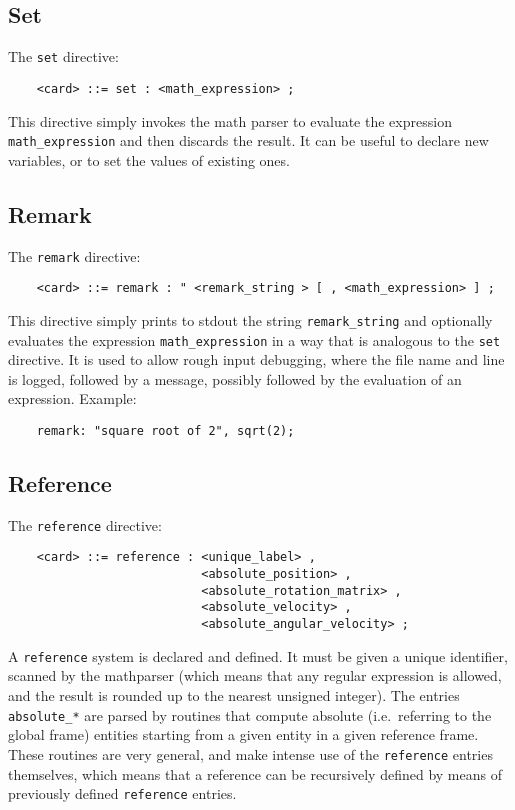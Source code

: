\subsection{Set}
The \texttt{set} directive:
\begin{verbatim}
    <card> ::= set : <math_expression> ;
\end{verbatim}
This directive simply invokes the math parser to evaluate the expression
\texttt{math\_expression} and then discards the result. It can be useful
to declare new variables, or to set the values of existing ones.

\subsection{Remark}
The \texttt{remark} directive:
\begin{verbatim}
    <card> ::= remark : " <remark_string > [ , <math_expression> ] ;
\end{verbatim}
This directive simply prints to stdout the string \texttt{remark\_string} and
optionally evaluates the expression \texttt{math\_expression} in a way that is
analogous to the \texttt{set} directive.
It is used to allow rough input debugging, where the file name and line 
is logged, followed by a message, possibly followed by the evaluation 
of an expression. 
Example:
\begin{verbatim}
    remark: "square root of 2", sqrt(2);
\end{verbatim}

\subsection{Reference}
The \texttt{reference} directive:
\begin{verbatim}
    <card> ::= reference : <unique_label> , 
                           <absolute_position> ,
                           <absolute_rotation_matrix> ,
                           <absolute_velocity> ,
                           <absolute_angular_velocity> ;
\end{verbatim}
A \texttt{reference} system is declared and defined.
It must be given a unique identifier, scanned by the mathparser
(which means that any regular expression is allowed, and the result is
rounded up to the nearest unsigned integer).
The entries \texttt{absolute\_*} are parsed by routines that
compute absolute (i.e.\ referring to the global frame) entities
starting from a given entity in a given reference frame.
These routines are very general, and make intense use of the 
\texttt{reference} entries themselves, which means that a reference 
can be recursively defined by means of previously defined 
\texttt{reference} entries.

